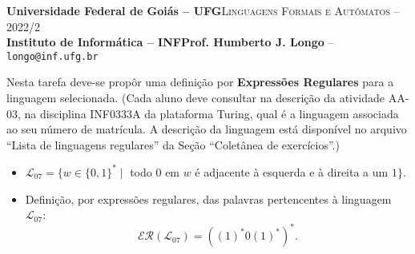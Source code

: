 \documentclass[12pt]{article}
\def\discente{Rafael Nunes Moreira Costa}
\def\matricula{202107855}
\def\ua{03}
\def\myling{{07}} %
\begin{document}
 \begin{tcolorbox}[rounded corners, colback=blue!3, colframe=blue!40!black]
  \footnotesize\textbf{Universidade Federal de Goiás -- UFG}\hfill \textsc{Linguagens Formais e Autômatos -- 2022/2}\\
  \footnotesize\textbf{Instituto de Informática -- INF\hfill Prof. Humberto J. Longo} -- \scriptsize\texttt{longo@inf.ufg.br}
 \end{tcolorbox}\bigskip
%
\begin{tcolorbox}[rounded corners, colback=blue!2, colframe=blue!40!black, title=\textbf{Atividade AA-\ua}]
   Nesta tarefa deve-se propôr uma definição por \textbf{Expressões Regulares} para a linguagem selecionada. (Cada aluno deve consultar na descrição da atividade AA-\ua, na disciplina INF0333A da plataforma Turing, qual é a linguagem associada ao seu número de matrícula. A descrição da linguagem está disponível no arquivo ``Lista de linguagens regulares'' da Seção ``Coletânea de exercícios''.)
\end{tcolorbox}\bigskip
%
\begin{tcolorbox}[rounded corners, colback=yellow!5, colframe=red!40!black, title=\textbf{\matricula\ -- \discente}]
 \begin{itemize}[leftmargin=*]
% 
  \item $\mathcal{L}_\myling = \{w\in\{0,1\}^*\mid$ todo $0$ em $w$ é adjacente à esquerda e à direita a um $1\}$.
%
  \item Definição, por expressões regulares, das palavras pertencentes à linguagem $\mathcal{L}_\myling$:
   $$\mathcal{ER}(\mathcal{L}_\myling) =
    ((1)^*0(1)^*)^*
   .$$
 \end{itemize}
\end{tcolorbox}
\end{document}
